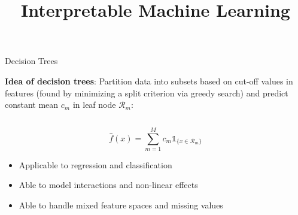 \documentclass[11pt,compress,t,notes=noshow, aspectratio=169, xcolor=table]{beamer}
\title{Interpretable Machine Learning}
\date{}
\begin{document}
\newcommand{\titlefigure}{figure/decision.png}
\newcommand{\learninggoals}{
\item Decision trees
\item RuleFit
\item Decision rules}



\begin{frame}{Decision Trees }


\textbf{Idea of decision trees}: 
Partition data into subsets based on cut-off values in features (found by minimizing a split criterion via greedy search) and predict constant mean $c_m$ in leaf node $\mathcal{R}_m$:

\begin{columns}[T, totalwidth=\textwidth]

\begin{column}{0.65\textwidth}
$$
\hat f(x) = \sum_{m=1}^M c_m \mathds{1}_{\{x \in \mathcal{R}_m\}}
$$

\pause
\begin{itemize}
    \item Applicable to regression and classification
    \item Able to model interactions and non-linear effects
    \item Able to handle mixed feature spaces and missing values
\end{itemize}


\end{column}
\end{columns}
\end{frame}
\end{document}
